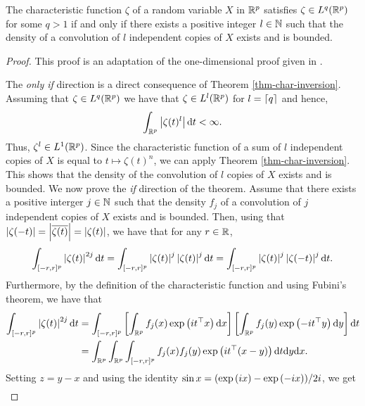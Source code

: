 \begin{lemma} \label{lem-char-integrable-convolution}
    The characteristic function $\zeta$ of a random variable $X$ in $\Rp$ satisfies $\zeta \in L^q(\Rp)$ for some $q > 1$ if and only if there exists a positive integer $l \in \N$ such that the density of a convolution of $l$ independent copies of $X$ exists and is bounded.
\end{lemma}
\begin{proof}
    This proof is an adaptation of the one-dimensional proof given in \cite[Lemma 2.4.4]{kolassa2006series}.

    The \textit{only if} direction is a direct consequence of Theorem \ref{thm-char-inversion}. Assuming that $\zeta \in L^q(\Rp)$ we have that $\zeta \in L^l(\Rp)$ for $l = \ceil{q}$ and hence,
    \begin{equation*}
        \intRp{t}{\abs{\zeta(t)^l}} < \infty.
    \end{equation*}
    Thus, $\zeta^l \in L^1(\Rp)$. Since the characteristic function of a sum of $l$ independent copies of $X$ is equal to $t \mapsto \zeta(t)^n$, we can apply Theorem \ref{thm-char-inversion}. This shows that the density of the convolution of $l$ copies of $X$ exists and is bounded.
    \newline
    We now prove the \textit{if} direction of the theorem. Assume that there exists a positive interger $j \in \N$ such that the density $f_j$ of a convolution of $j$ independent copies of $X$ exists and is bounded. Then, using that $\abs{\zeta(-t)} = \abs{\overline{\zeta(t)}} = \abs{\zeta(t)}$, we have that for any $r \in \R$,
    \begin{equation*}
        \int_{[-r, r]^p} \abs{\zeta(t)}^{2j} \d t
        = \int_{[-r, r]^p} \abs{\zeta(t)}^j\abs{\zeta(t)}^j \d t
        = \int_{[-r, r]^p} \abs{\zeta(t)}^j\abs{\zeta(-t)}^j \d t.
    \end{equation*}
    Furthermore, by the definition of the characteristic function and using Fubini's theorem, we have that
    \begin{align*}
        \int_{[-r, r]^p} \abs{\zeta(t)}^{2j} \d t
        &= \int_{[-r, r]^p} \left[\intRp{x}{f_j(x)\expf{it^\top x}}\right]\left[\intRp{y}{f_j(y)\expf{-it^\top y}}\right] \d t\\
        &= \intRp{x}{\intRp{y}{\int_{[-r, r]^p} f_j(x)f_j(y)\expf{it^\top (x - y)}\d t}}.
    \end{align*}
    Setting $z = y - x$ and using the identity $\sin x = (\expf{ix} - \expf{-ix}) / 2i$, we get
    \begin{align*}

\end{align*}
\end{proof}

